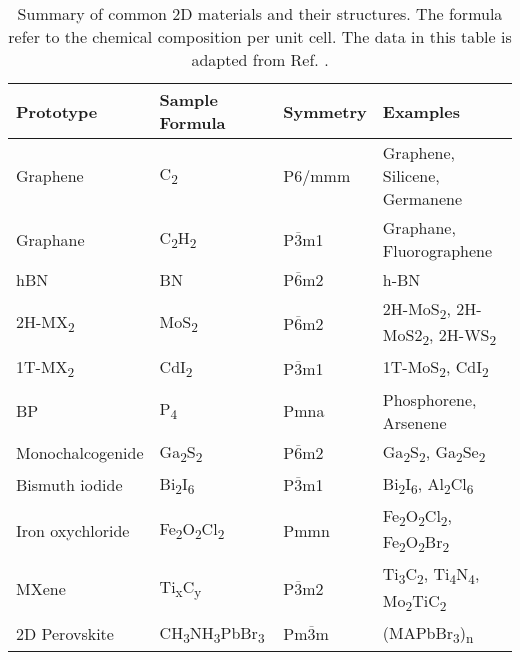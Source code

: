 \begin{table}[t]
  \centering
  \caption{Summary of common 2D materials and their structures. The
    formula refer to the chemical composition per unit cell. The data
    in this table is adapted from Ref. \cite{Haastrup_2018_database}.}
  \label{tab:category-2D}
      \begin{tabular}{llll}
    \hline
    Prototype  & Sample Formula  & Symmetry & Examples \\
    \hline
    Graphene & C\textsubscript{2} &  P6/mmm & Graphene, Silicene, Germanene \\
    Graphane & C\textsubscript{2}H\textsubscript{2} &  P$\overline{3}$m1 & Graphane, Fluoro\-graphene\\
    hBN      & BN                & P$\overline{6}$m2 & h-BN \\
    2H-MX\textsubscript{2} & MoS\textsubscript{2} & P$\overline{6}$m2 & 2H-MoS\textsubscript{2}, 2H-MoS2\textsubscript{2}, 2H-WS\textsubscript{2} \\
    1T-MX\textsubscript{2} & CdI\textsubscript{2} & P$\overline{3}$m1 & 1T-MoS\textsubscript{2}, CdI\textsubscript{2}\\
    BP & P\textsubscript{4} & Pmna & Phosphorene, Arsenene \\
    Mono\-chalcogenide & Ga\textsubscript{2}S\textsubscript{2} & P$\overline{6}$m2 & Ga\textsubscript{2}S\textsubscript{2}, Ga\textsubscript{2}Se\textsubscript{2} \\
    Bismuth iodide &  Bi\textsubscript{2}I\textsubscript{6} & P$\overline{3}$m1 & Bi\textsubscript{2}I\textsubscript{6}, Al\textsubscript{2}Cl\textsubscript{6} \\
    Iron oxychloride                &  Fe\textsubscript{2}O\textsubscript{2}Cl\textsubscript{2} & Pmmn & Fe\textsubscript{2}O\textsubscript{2}Cl\textsubscript{2}, Fe\textsubscript{2}O\textsubscript{2}Br\textsubscript{2}  \\
    MXene & Ti\textsubscript{x}C\textsubscript{y} & P$\overline{3}$m2 & Ti\textsubscript{3}C\textsubscript{2}, Ti\textsubscript{4}N\textsubscript{4}, Mo\textsubscript{2}TiC\textsubscript{2} \\
    2D Perovskite & CH\textsubscript{3}NH\textsubscript{3}PbBr\textsubscript{3} & Pm$\overline{3}$m & (MAPbBr\textsubscript{3})\textsubscript{n}\\
   \hline
      \end{tabular}
\end{table}


